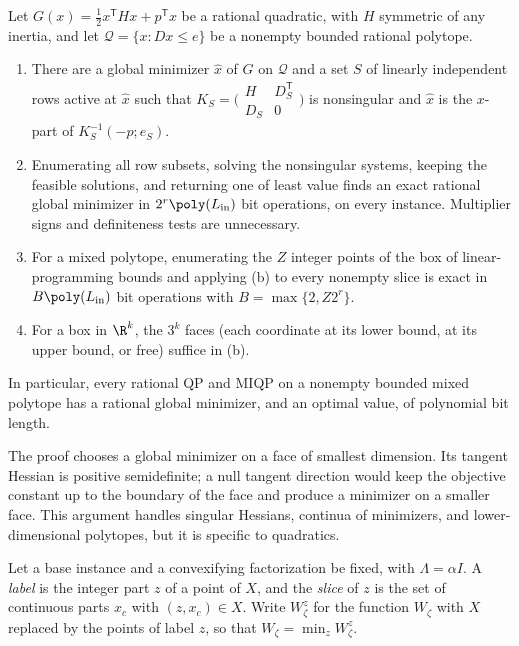 \begin{lemma}\label{lem:qp:face}
Let $G(x)=\frac12x^{\mathsf T} Hx+p^{\mathsf T} x$ be a rational quadratic, with $H$
symmetric of any inertia, and let $\mathcal Q=\{x:Dx\le e\}$ be a nonempty
bounded rational polytope.
\begin{enumerate}[label=(\alph*)]
\item There are a global minimizer $\hat x$ of $G$ on $\mathcal Q$ and a set
 $S$ of linearly independent rows active at $\hat x$ such that
 $K_S=\bigl(\begin{smallmatrix}H&D_S^{\mathsf T}\\D_S&0\end{smallmatrix}\bigr)$ is
 nonsingular and $\hat x$ is the $x$-part of $K_S^{-1}(-p;e_S)$.
\item Enumerating all row subsets, solving the nonsingular systems, keeping
 the feasible solutions, and returning one of least value finds an exact
 rational global minimizer in $2^r\poly(L_{\rm in})$ bit operations, on every
 instance. Multiplier signs and definiteness tests are unnecessary.
\item For a mixed polytope, enumerating the $Z$ integer points of the box of
 linear-programming bounds and applying (b) to every nonempty slice is exact
 in $B\poly(L_{\rm in})$ bit operations with $B=\max\{2,Z2^r\}$.
\item For a box in $\R^k$, the $3^k$ faces (each coordinate at its lower
 bound, at its upper bound, or free) suffice in (b).
\end{enumerate}
In particular, every rational QP and MIQP on a nonempty bounded mixed polytope has a
rational global minimizer, and an optimal value, of polynomial bit length.
\end{lemma}

The proof chooses a global minimizer on a face of smallest dimension. Its
tangent Hessian is positive semidefinite; a null tangent direction would keep
the objective constant up to the boundary of the face and produce a minimizer
on a smaller face. This argument handles singular Hessians, continua of
minimizers, and lower-dimensional polytopes, but it is specific to quadratics.

Let a base instance and a convexifying factorization be fixed, with
$\Lambda=\alpha I$. A \emph{label} is the integer part $z$ of a point of $X$,
and the \emph{slice} of $z$ is the set of continuous parts $x_c$ with
$(z,x_c)\in X$. Write $W_\zeta^z$ for the function $W_\zeta$ with $X$
replaced by the points of label $z$, so that $W_\zeta=\min_zW_\zeta^z$.

